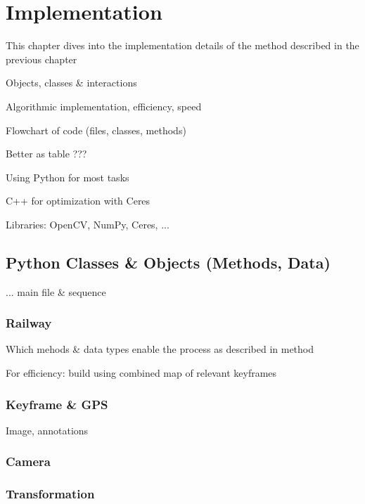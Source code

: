 \chapter{Implementation}
\label{chapter:implementation}

This chapter dives into the implementation details of the method described in the previous chapter


Objects, classes \& interactions

Algorithmic implementation, efficiency, speed

Flowchart of code (files, classes, methods)


Better as table ???



Using Python for most tasks

C++ for optimization with Ceres

Libraries: OpenCV, NumPy, Ceres, ...

\section{Python Classes \& Objects (Methods, Data)}


... main file \& sequence


\subsection{Railway}

Which mehods \& data types enable the process as described in method


For efficiency: build using combined map of relevant keyframes


\subsection{Keyframe \& GPS}


Image, annotations


\subsection{Camera}





\subsection{Transformation}






